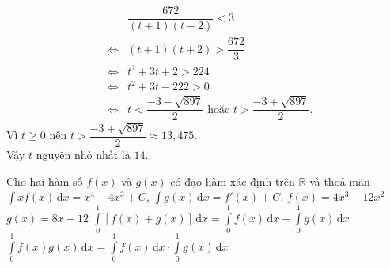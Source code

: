 \begin{ex}
{\begin{itemchoice}
			\begin{eqnarray*}
				&&\dfrac{672}{(t+1)(t+2)} < 3 \\
				&\Leftrightarrow&(t+1)(t+2) > \dfrac{672}{3}\\
				&\Leftrightarrow&t^2+3t+2 > 224 \\
				&\Leftrightarrow&t^2+3t-222 > 0\\
				&\Leftrightarrow&t<\dfrac{-3-\sqrt{897}}{2}\text{ hoặc }t>\dfrac{-3+\sqrt{897}}{2}.
			\end{eqnarray*}
			Vì $t\geq 0$ nên $t>\dfrac{-3+\sqrt{897}}{2}\approx 13{,}475$.\\
			Vậy $t$ nguyên nhỏ nhất là $14$.
		\end{itemchoice}
	}
\end{ex}

\begin{ex} %
	Cho hai hàm số $f(x)$ và $g(x)$ có đạo hàm xác định trên $\mathbb{R}$ và thoả mãn $\displaystyle\int x f(x)\,\mathrm{d}x = x^4 - 4x^3 + C$, $\displaystyle\int g(x)\,\mathrm{d}x = f'(x) + C$.
	\choiceTF
	{$f(x) = 4x^3 - 12x^2$}
	{$g(x) = 8x - 12$}
	{\True $\displaystyle\int\limits_0^1 [f(x) + g(x)]\,\mathrm{d}x = \displaystyle\int\limits_0^1 f(x)\,\mathrm{d}x + \displaystyle\int\limits_0^1 g(x)\,\mathrm{d}x$}
	{\True $\displaystyle\int\limits_0^1 f(x)g(x)\,\mathrm{d}x = \displaystyle\int\limits_0^1 f(x)\,\mathrm{d}x \cdot \displaystyle\int\limits_0^1 g(x)\,\mathrm{d}x$}
\end{ex}

